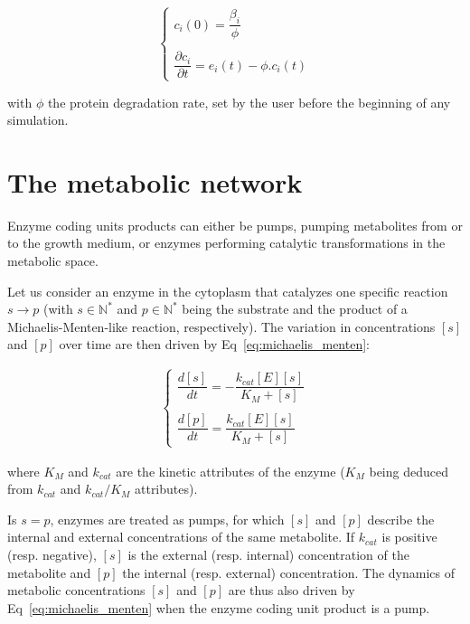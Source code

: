 \begin{enumerate}
\begin{equation}
\left\{
\begin{array}{l}
c_i(0) = \dfrac{\beta_i}{\phi}\\\\
\dfrac{\partial c_i}{\partial t} = e_i(t) - \phi . c_i(t)
\end{array}
\right.
\end{equation}

with $\phi$ the protein degradation rate, set by the user before the beginning of any simulation.

\end{enumerate}


\section{The metabolic network}
\label{sec:part2:methodology:metabolism}

Enzyme coding units products can either be pumps, pumping metabolites from or to the growth medium, or enzymes performing catalytic transformations in the metabolic space.
 
Let us consider an enzyme in the cytoplasm that catalyzes one specific reaction $s \rightarrow p$ (with $s \in \mathbb{N}^*$ and $p \in \mathbb{N}^*$ being the substrate and the product of a Michaelis-Menten-like reaction, respectively). The variation in concentrations $[s]$ and $[p]$ over time are then driven by Eq~\ref{eq:michaelis_menten}:

\begin{eqnarray}
\label{eq:michaelis_menten}
\left\{
\begin{array}{lcr}
\dfrac{d[s]}{dt} = -\dfrac{k_{cat}[E][s]}{K_M+[s]}\\\\
\dfrac{d[p]}{dt} = \dfrac{k_{cat}[E][s]}{K_M+[s]}
\end{array}
\right.
\end{eqnarray}

where $K_M$ and $k_{cat}$ are the kinetic attributes of the enzyme ($K_M$ being deduced from $k_{cat}$ and $k_{cat}/K_M$ attributes).

Is $s=p$, enzymes are treated as pumps, for which $[s]$ and $[p]$ describe the internal and external concentrations of the same metabolite. If $k_{cat}$ is positive (resp. negative), $[s]$ is the external (resp. internal) concentration of the metabolite and $[p]$ the internal (resp. external) concentration. The dynamics of metabolic concentrations $[s]$ and $[p]$ are thus also driven by Eq~\ref{eq:michaelis_menten} when the enzyme coding unit product is a pump.


